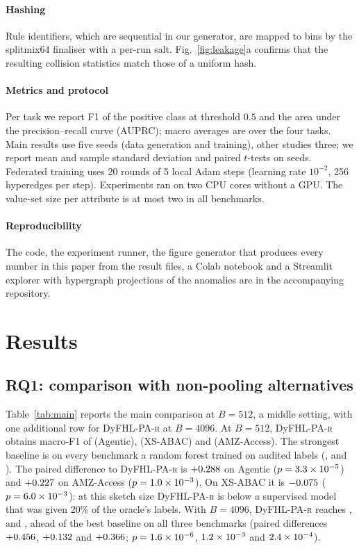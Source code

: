 \documentclass[preprint,12pt]{elsarticle}
\theoremstyle{definition}
\newcommand{\name}{DyFHL-PA\xspace}
\newcommand{\R}{\textsc{r}}
\begin{document}
\paragraph{Hashing} Rule identifiers, which are sequential in our generator, are mapped to bins by the splitmix64 finaliser with a per-run salt. Fig.~\ref{fig:leakage}a confirms that the resulting collision statistics match those of a uniform hash.

\paragraph{Metrics and protocol} Per task we report F1 of the positive class at threshold $0.5$ and the area under the precision--recall curve (AUPRC); macro averages are over the four tasks. Main results use five seeds (data generation and training), other studies three; we report mean and sample standard deviation and paired $t$-tests on seeds. Federated training uses 20 rounds of 5 local Adam steps (learning rate $10^{-2}$, 256 hyperedges per step). Experiments ran on two CPU cores without a GPU. The value-set size per attribute is at most two in all benchmarks.

\paragraph{Reproducibility} The code, the experiment runner, the figure generator that produces every number in this paper from the result files, a Colab notebook and a Streamlit explorer with hypergraph projections of the anomalies are in the accompanying repository.

\section{Results}
\label{sec:results}

\subsection{RQ1: comparison with non-pooling alternatives}
Table~\ref{tab:main} reports the main comparison at $B=512$, a middle setting, with one additional row for \name-\R{} at $B=4096$. At $B=512$, \name-\R{} obtains macro-F1 of \mainagenticR{} (Agentic), \mainxustollerR{} (XS-ABAC) and \mainamazonR{} (AMZ-Access). The strongest baseline is on every benchmark a random forest trained on audited labels (\mainagenticbest, \mainxustollerbest{} and \mainamazonbest). The paired difference to \name-\R{} is $+0.288$ on Agentic ($p=3.3\times10^{-5}$) and $+0.227$ on AMZ-Access ($p=1.0\times10^{-3}$). On XS-ABAC it is $-0.075$ ($p=6.0\times10^{-3}$): at this sketch size \name-\R{} is below a supervised model that was given 20\% of the oracle's labels. With $B=4096$, \name-\R{} reaches \mainagenticRbig, \mainxustollerRbig{} and \mainamazonRbig, ahead of the best baseline on all three benchmarks (paired differences $+0.456$, $+0.132$ and $+0.366$; $p=1.6\times10^{-6}$, $1.2\times10^{-3}$ and $2.4\times10^{-4}$).
\end{document}

